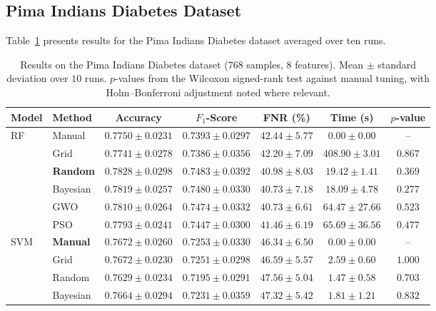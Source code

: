 \documentclass[letterpaper, 10 pt, conference]{ieeeconf}
\begin{document}
\subsection{Pima Indians Diabetes Dataset}
\label{subsec:pima_results}

Table~\ref{tab:pima_results} presents results for the Pima Indians Diabetes dataset averaged over ten runs.

\begin{table}[t]
	\caption{Results on the Pima Indians Diabetes dataset ($768$ samples, $8$ features). Mean $\pm$ standard deviation over $10$ runs. $p$-values from the Wilcoxon signed-rank test against manual tuning, with Holm--Bonferroni adjustment noted where relevant.}
	\label{tab:pima_results}
	\centering
	\scriptsize
	\begin{tabular}{|l|l|c|c|c|c|c|}
		\hline
		\textbf{Model} & \textbf{Method} & \textbf{Accuracy} & \textbf{$F_1$-Score} & \textbf{FNR (\%)} & \textbf{Time (s)} & \textbf{$p$-value} \\
		\hline
		\multirow{6}{*}{RF}
		& Manual   & $0.7750 \pm 0.0231$ & $0.7393 \pm 0.0297$ & $42.44 \pm 5.77$ & $0.00 \pm 0.00$ & -- \\
		& Grid     & $0.7741 \pm 0.0278$ & $0.7386 \pm 0.0356$ & $42.20 \pm 7.09$ & $408.90 \pm 3.01$ & $0.867$ \\
		& \textbf{Random}   & $\mathbf{0.7828 \pm 0.0298}$ & $\mathbf{0.7483 \pm 0.0392}$ & $\mathbf{40.98 \pm 8.03}$ & $19.42 \pm 1.41$ & $0.369$ \\
		& Bayesian & $0.7819 \pm 0.0257$ & $0.7480 \pm 0.0330$ & $40.73 \pm 7.18$ & $18.09 \pm 4.78$ & $0.277$ \\
		& GWO      & $0.7810 \pm 0.0264$ & $0.7474 \pm 0.0332$ & $40.73 \pm 6.61$ & $64.47 \pm 27.66$ & $0.523$ \\
		& PSO      & $0.7793 \pm 0.0241$ & $0.7447 \pm 0.0300$ & $41.46 \pm 6.19$ & $65.69 \pm 36.56$ & $0.477$ \\
		\hline
		\multirow{6}{*}{SVM}
		& \textbf{Manual}   & $\mathbf{0.7672 \pm 0.0260}$ & $0.7253 \pm 0.0330$ & $46.34 \pm 6.50$ & $0.00 \pm 0.00$ & -- \\
		& Grid     & $0.7672 \pm 0.0230$ & $0.7251 \pm 0.0298$ & $46.59 \pm 5.57$ & $2.59 \pm 0.60$ & $1.000$ \\
		& Random   & $0.7629 \pm 0.0234$ & $0.7195 \pm 0.0291$ & $47.56 \pm 5.04$ & $1.47 \pm 0.58$ & $0.703$ \\
		& Bayesian & $0.7664 \pm 0.0294$ & $0.7231 \pm 0.0359$ & $47.32 \pm 5.42$ & $1.81 \pm 1.21$ & $0.832$ \\

\end{tabular}
\end{table}
\end{document}
